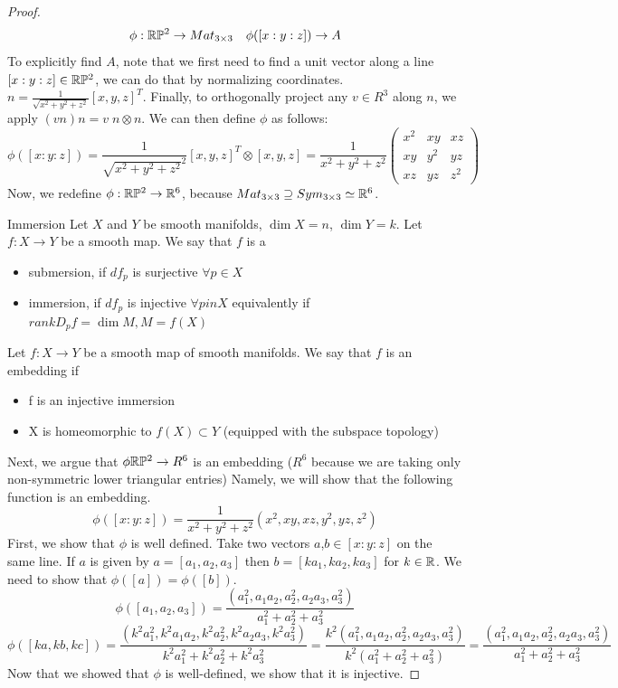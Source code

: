 \documentclass[11pt,a4paper]{report}
\begin{document}
\begin{proof}
$$ \phi: \mathbb{R} \mathbb{P} ^2 \to Mat_{3 \times 3}  \quad \phi([x:y:z]) \to A $$
To explicitly find $A$, note that we first need to find a unit vector along a line $[x:y:z] \in \mathbb{R} \mathbb{P} ^2$,
we can do that by normalizing coordinates. $n = \frac{1}{\sqrt{x^2 + y^2 + z^2}} [x,y,z]^T $.
Finally, to orthogonally project any $v \in R^3$ along $n$, we apply $(v n) n = v \; n \otimes n$. We can then define $\phi$ as follows:
$$ \phi([x:y:z])  = \frac{1}{\sqrt{x^2+y^2+z^2}^2} [x,y,z]^T \otimes [x,y,z] = \frac{1}{x^2 + y^2 + z^2} 
\begin{pmatrix}
x^2 & xy & xz \\
xy & y^2 & yz  \\
xz & yz & z^2
\end{pmatrix} $$
Now, we redefine $\phi: \mathbb{R} \mathbb{P} ^2 \to \mathbb{R}^6$, because  $Mat_{3 \times 3} \supseteq Sym_{3 \times 3} \simeq \mathbb{R}^6$.
\begin{defn}{Immersion}
Let $X$ and $Y$ be smooth manifolds, $\dim X =n $, $\dim Y = k$. Let $f : X \to Y$ be a smooth map.
We say that $f$ is a
\begin{itemize}
    \item submersion, if $df_p$ is surjective $\forall p \in X$
    \item immersion, if $df_p$ is injective $\forall p in X$ equivalently if $rank D_p f = \dim M, M=f(X)$
\end{itemize}
\end{defn}
\begin{defn}
    Let $f: X \to Y$ be a smooth map of smooth manifolds. We say that $f$ is an embedding if 
    \begin{itemize}
        \item f is an injective immersion
        \item X is homeomorphic to $f(X) \subset Y$ (equipped with the subspace topology)
    \end{itemize}
\end{defn}
Next, we argue that $\phi \mathbb{R} \mathbb{P} ^2 \to R^6$ is an embedding ($R^6$ because we are taking only non-symmetric lower triangular entries)
Namely, we will show that the following function is an embedding.
$$ \phi([x:y:z]) = \frac{1}{x^2+y^2+z^2} (x^2,xy, xz, y^2, yz, z^2) $$
First, we show that $\phi$ is well defined. Take two vectors $a$,$b \in [x:y:z]$ on the same line.
If $a$ is given by $a=[a_1,a_2,a_3]$ then $b = [k a_1, k a_2, k a_3]$ for $k \in \mathbb{R}$. We need to show that 
$\phi([a]) = \phi([b])$.
$$\phi([a_1,a_2,a_3]) = \frac{(a_1^2, a_1a_2, a_2^2, a_2a_3, a_3^2)}{a_1^2+a_2^2+a_3^2}$$
$$\phi([ka,kb,kc]) = 
\frac{(k^2 a_1^2, k^2 a_1a_2, k^2 a_2^2, k^2 a_2a_3, k^2 a_3^2)}{k^2 a_1^2+ k^2 a_2^2+ k^2 a_3^2} 
=  \frac{ k^2 (a_1^2, a_1 a_2, a_2^2, a_2a_3, a_3^2) }{ k^2 (a_1^2+a_2^2+a_3^2)  }
= \frac{(a_1^2, a_1a_2, a_2^2, a_2a_3, a_3^2)}{a_1^2+a_2^2+a_3^2} $$
Now that we showed that $\phi$ is well-defined, we show that it is injective.


\end{proof}
\end{document}
